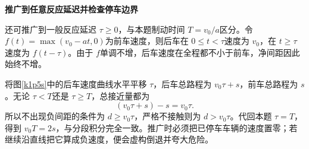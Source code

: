 \begin{solution}

\par\medskip{}\noindent\textbf{推广到任意反应延迟并检查停车边界}\par\nobreak
还可推广到一般反应延迟 $\tau\ge0$，与本题制动时间 $T=v_0/a$区分。令
$f(t)=\max(v_0-at,0)$为前车速度，则后车在 $0\le t<\tau$速度为 $v_0$，在 $t\ge\tau$速度为 $f(t-\tau)$。由于 $f$单调不增，后车速度在全程都不小于前车，净间距因此始终不增。

将图\ref{k1p5s}中的后车速度曲线水平平移 $\tau$，后车总路程为 $v_0\tau+s$，前车总路程为 $s$。无论 $\tau<T$还是 $\tau\ge T$，总接近量都为
\[(v_0\tau+s)-s=v_0\tau.\]
所以不出现负间距的条件为 $d\ge v_0\tau$，严格不接触则为 $d>v_0\tau$。代回本题 $\tau=T$，得到 $v_0T=2s$，与分段积分完全一致。推广时必须把已停车车辆的速度置零；若继续沿直线把它算成负速度，便会虚构倒退并夸大危险。
\end{solution}


